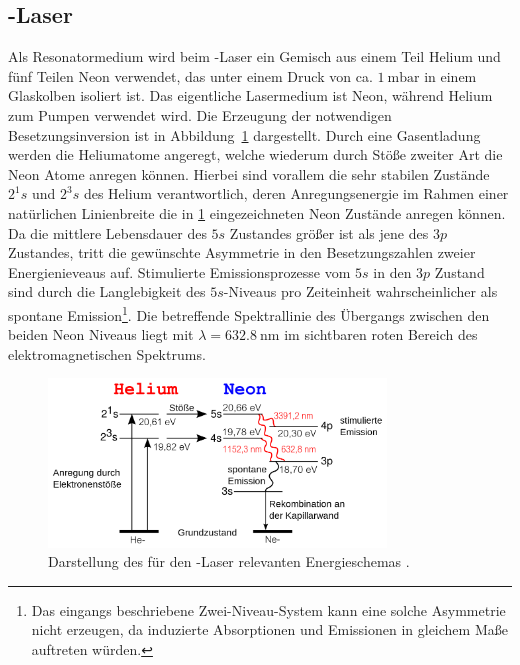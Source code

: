 \subsection{-Laser }
Als Resonatormedium wird beim -Laser ein Gemisch aus einem Teil Helium und fünf Teilen Neon verwendet, das unter einem Druck von
ca. $\SI{1}{\milli\bar}$ in einem Glaskolben isoliert ist. Das eigentliche Lasermedium ist Neon, während Helium zum Pumpen verwendet wird.
Die Erzeugung der notwendigen Besetzungsinversion ist in Abbildung~\ref{fig: energieschema} dargestellt. Durch eine Gasentladung werden
die Heliumatome angeregt, welche wiederum durch Stöße zweiter Art die Neon Atome anregen können. Hierbei sind vorallem die sehr stabilen Zustände
$2^1s$ und $2^3s$ des Helium verantwortlich, deren Anregungsenergie im Rahmen einer natürlichen Linienbreite die in \ref{fig: energieschema}
eingezeichneten Neon Zustände anregen können. Da die mittlere Lebensdauer des $5s$ Zustandes größer ist als jene des $3p$ Zustandes, tritt die gewünschte
Asymmetrie in den Besetzungszahlen zweier Energienieveaus auf. Stimulierte Emissionsprozesse vom $5s$ in den $3p$ Zustand sind durch die Langlebigkeit
des $5s$-Niveaus pro Zeiteinheit wahrscheinlicher als spontane Emission\footnote{Das eingangs beschriebene Zwei-Niveau-System kann eine solche
Asymmetrie nicht erzeugen, da induzierte Absorptionen und Emissionen in gleichem Maße auftreten würden.}.
Die betreffende Spektrallinie des Übergangs zwischen den beiden Neon Niveaus liegt mit $\lambda = \SI{632.8}{\nano\meter}$ im sichtbaren
roten Bereich des elektromagnetischen Spektrums.
\begin{figure}
  \centering
  \includegraphics[width = 0.8\textwidth]{theorie_bilder/energieschema.png}
  \caption{Darstellung des für den -Laser relevanten Energieschemas \cite{wiki}.}
  \label{fig: energieschema}
\end{figure}
